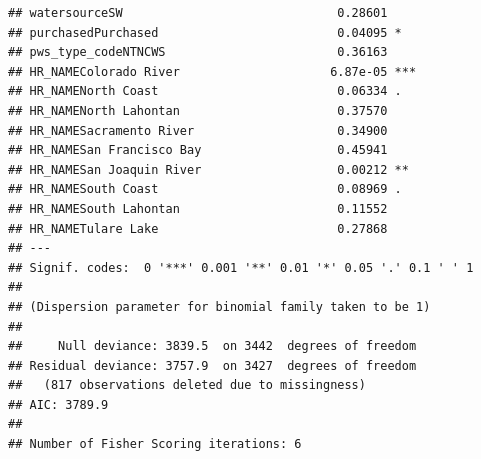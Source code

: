 \documentclass[
]{article}
\begin{document}
\begin{verbatim}
## watersourceSW                              0.28601    
## purchasedPurchased                         0.04095 *  
## pws_type_codeNTNCWS                        0.36163    
## HR_NAMEColorado River                     6.87e-05 ***
## HR_NAMENorth Coast                         0.06334 .  
## HR_NAMENorth Lahontan                      0.37570    
## HR_NAMESacramento River                    0.34900    
## HR_NAMESan Francisco Bay                   0.45941    
## HR_NAMESan Joaquin River                   0.00212 ** 
## HR_NAMESouth Coast                         0.08969 .  
## HR_NAMESouth Lahontan                      0.11552    
## HR_NAMETulare Lake                         0.27868    
## ---
## Signif. codes:  0 '***' 0.001 '**' 0.01 '*' 0.05 '.' 0.1 ' ' 1
## 
## (Dispersion parameter for binomial family taken to be 1)
## 
##     Null deviance: 3839.5  on 3442  degrees of freedom
## Residual deviance: 3757.9  on 3427  degrees of freedom
##   (817 observations deleted due to missingness)
## AIC: 3789.9
## 
## Number of Fisher Scoring iterations: 6
\end{verbatim}
\end{document}
